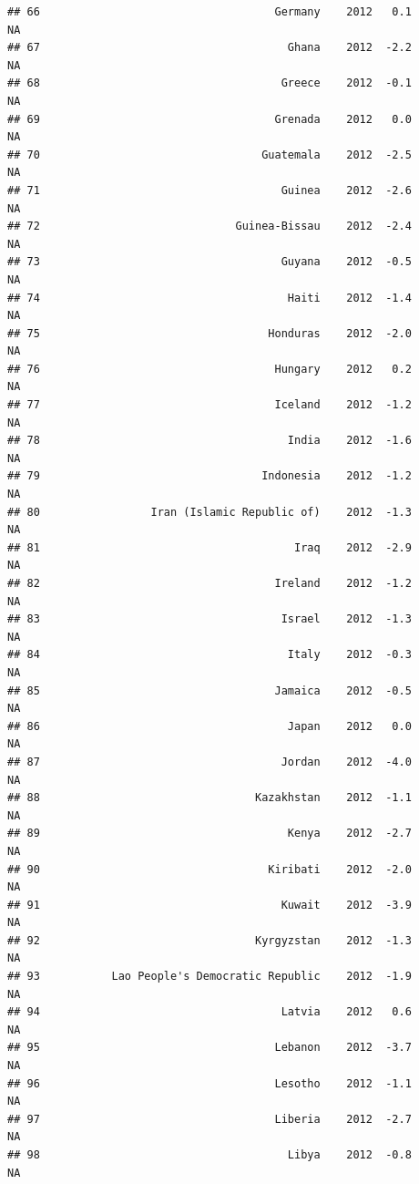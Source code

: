 \documentclass[
]{book}
\begin{document}
\begin{verbatim}
## 66                                    Germany    2012   0.1              NA
## 67                                      Ghana    2012  -2.2              NA
## 68                                     Greece    2012  -0.1              NA
## 69                                    Grenada    2012   0.0              NA
## 70                                  Guatemala    2012  -2.5              NA
## 71                                     Guinea    2012  -2.6              NA
## 72                              Guinea-Bissau    2012  -2.4              NA
## 73                                     Guyana    2012  -0.5              NA
## 74                                      Haiti    2012  -1.4              NA
## 75                                   Honduras    2012  -2.0              NA
## 76                                    Hungary    2012   0.2              NA
## 77                                    Iceland    2012  -1.2              NA
## 78                                      India    2012  -1.6              NA
## 79                                  Indonesia    2012  -1.2              NA
## 80                 Iran (Islamic Republic of)    2012  -1.3              NA
## 81                                       Iraq    2012  -2.9              NA
## 82                                    Ireland    2012  -1.2              NA
## 83                                     Israel    2012  -1.3              NA
## 84                                      Italy    2012  -0.3              NA
## 85                                    Jamaica    2012  -0.5              NA
## 86                                      Japan    2012   0.0              NA
## 87                                     Jordan    2012  -4.0              NA
## 88                                 Kazakhstan    2012  -1.1              NA
## 89                                      Kenya    2012  -2.7              NA
## 90                                   Kiribati    2012  -2.0              NA
## 91                                     Kuwait    2012  -3.9              NA
## 92                                 Kyrgyzstan    2012  -1.3              NA
## 93           Lao People's Democratic Republic    2012  -1.9              NA
## 94                                     Latvia    2012   0.6              NA
## 95                                    Lebanon    2012  -3.7              NA
## 96                                    Lesotho    2012  -1.1              NA
## 97                                    Liberia    2012  -2.7              NA
## 98                                      Libya    2012  -0.8              NA

\end{verbatim}
\end{document}
